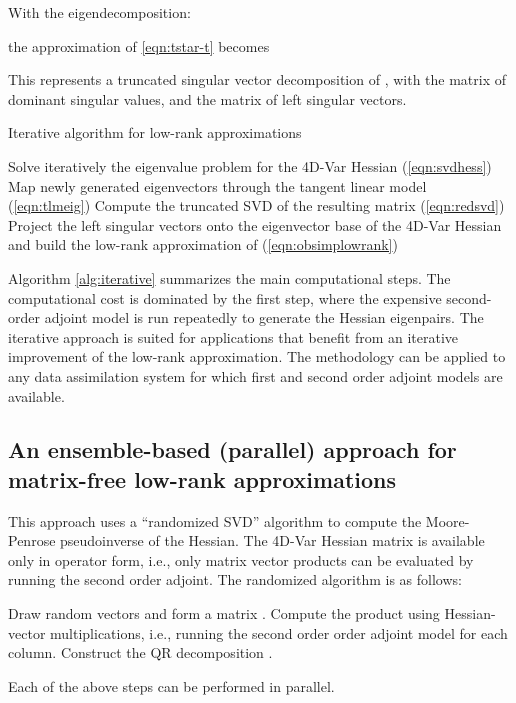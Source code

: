 \documentclass[final,sort&compress]{elsarticle}
\begin{document}
With the eigendecomposition:

the approximation of \eqref{eqn:tstar-t} becomes

This represents a truncated singular vector decomposition of , with  the matrix of dominant singular values, and 
 the matrix of left singular vectors.

\begin{algorithm}[h]
\caption{\label{alg:iterative}Iterative algorithm for low-rank approximations}
\begin{algorithmic}[1]
\State Solve iteratively the eigenvalue problem for the 4D-Var Hessian (\ref{eqn:svdhess})
\State Map newly generated eigenvectors through the tangent linear model (\ref{eqn:tlmeig})
\State Compute the truncated SVD of the resulting matrix (\ref{eqn:redsvd})
\State Project the left singular vectors onto the eigenvector base of the 4D-Var Hessian and build the low-rank approximation of  (\ref{eqn:obsimplowrank})
\end{algorithmic}
\end{algorithm}

Algorithm \ref{alg:iterative} summarizes the main computational steps. The computational cost is
dominated by the first step, where the expensive second-order adjoint model is run repeatedly to generate the 
Hessian eigenpairs.
The iterative approach is suited for applications that benefit from an iterative improvement of the low-rank approximation. 
The methodology can be applied to any data assimilation system for which first and second order adjoint models are available.

\subsection{An ensemble-based (parallel) approach for matrix-free low-rank approximations}

This approach uses a ``randomized SVD'' algorithm \cite{liberty2007randomized} to compute the Moore-Penrose pseudoinverse \cite{lewis1968pseudoinverss}
of the Hessian. The 4D-Var Hessian matrix  is available only in operator form, i.e., only matrix vector products can be evaluated by running the second order adjoint. 
The randomized algorithm is as follows:
\begin{algorithmic}[1]
\State Draw  random vectors and form a matrix .
\State Compute the product  using Hessian-vector multiplications, i.e., running the second order order adjoint model for each column.
\State Construct the QR decomposition .
\end{algorithmic}
Each of the above steps can be performed in parallel.
\end{document}
